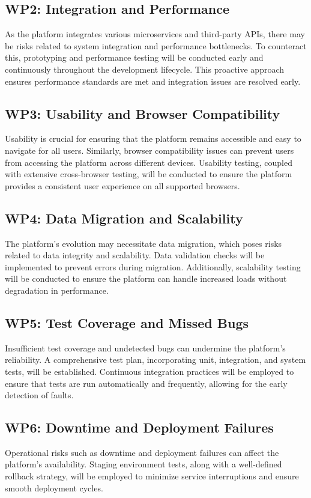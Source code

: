 \documentclass[12pt]{report}
\begin{document}
\subsection{WP2: Integration and Performance}
As the platform integrates various microservices and third-party APIs, there may be risks related to system integration and performance bottlenecks. To counteract this, prototyping and performance testing will be conducted early and continuously throughout the development lifecycle. This proactive approach ensures performance standards are met and integration issues are resolved early.

\subsection{WP3: Usability and Browser Compatibility}
Usability is crucial for ensuring that the platform remains accessible and easy to navigate for all users. Similarly, browser compatibility issues can prevent users from accessing the platform across different devices. Usability testing, coupled with extensive cross-browser testing, will be conducted to ensure the platform provides a consistent user experience on all supported browsers.

\subsection{WP4: Data Migration and Scalability}
The platform's evolution may necessitate data migration, which poses risks related to data integrity and scalability. Data validation checks will be implemented to prevent errors during migration. Additionally, scalability testing will be conducted to ensure the platform can handle increased loads without degradation in performance.

\subsection{WP5: Test Coverage and Missed Bugs}
Insufficient test coverage and undetected bugs can undermine the platform's reliability. A comprehensive test plan, incorporating unit, integration, and system tests, will be established. Continuous integration practices will be employed to ensure that tests are run automatically and frequently, allowing for the early detection of faults.

\subsection{WP6: Downtime and Deployment Failures}
Operational risks such as downtime and deployment failures can affect the platform's availability. Staging environment tests, along with a well-defined rollback strategy, will be employed to minimize service interruptions and ensure smooth deployment cycles.
\end{document}
